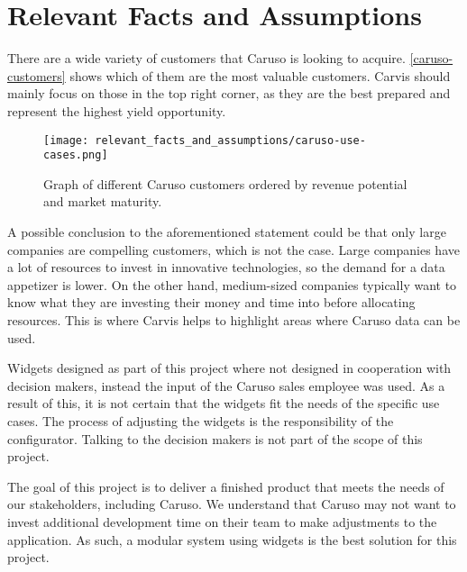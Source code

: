 \chapter{Relevant Facts and Assumptions}

There are a wide variety of customers that Caruso is looking to acquire. \autoref{caruso-customers} shows which of them are the most valuable customers. Carvis should mainly focus on those in the top right corner, as they are the best prepared and represent the highest yield opportunity.

\begin{figure}[ht]
  \centering
  \texttt{[image: relevant\_facts\_and\_assumptions/caruso-use-cases.png]}
  \caption{Graph of different Caruso customers ordered by revenue potential and market maturity.}
  \label{caruso-customers}
\end{figure}

A possible conclusion to the aforementioned statement could be that only large companies are compelling customers, which is not the case. Large companies have a lot of resources to invest in innovative technologies, so the demand for a data appetizer is lower. On the other hand, medium-sized companies typically want to know what they are investing their money and time into before allocating resources. This is where Carvis helps to highlight areas where Caruso data can be used.

Widgets designed as part of this project where not designed in cooperation with decision makers, instead the input of the Caruso sales employee was used. As a result of this, it is not certain that the widgets fit the needs of the specific use cases. The process of adjusting the widgets is the responsibility of the configurator. Talking to the decision makers is not part of the scope of this project.

The goal of this project is to deliver a finished product that meets the needs of our stakeholders, including Caruso. We understand that Caruso may not want to invest additional development time on their team to make adjustments to the application. As such, a modular system using widgets is the best solution for this project.